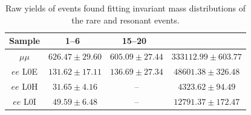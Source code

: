 \begin{table}
\centering
\begin{tabular}{|c|c|c|c|}
\hline
 Sample 			& 1--6~\gevgevcccc 			& 15--20~\gevgevcccc 		& \jpsi  \\ \hline
$\mu\mu$ 		& $ 626.47  \pm 29.60  $ 		& $ 605.09  \pm 27.44 $ 		& $ 333112.99  \pm 603.77 $ \\
$ee$ L0E 			& $ 131.62   \pm  17.11$   	& $ 136.69  \pm 27.34 $ 		& $ 48601.38  \pm 326.48 $ \\
$ee$ L0H 			& $ 31.65   \pm  4.16$ 		& 			-- 			& $ 4323.62  \pm 94.49 $ \\
$ee$ L0I 			& $ 49.59   \pm  6.48$ 		& 			-- 			& $ 12791.37  \pm 172.47 $ \\
\hline
 \end{tabular}
\caption{Raw yields of events found fitting invariant mass distributions of the rare and resonant events. }
\label{tab:RKst_yields}
\end{table}


\clearpage

